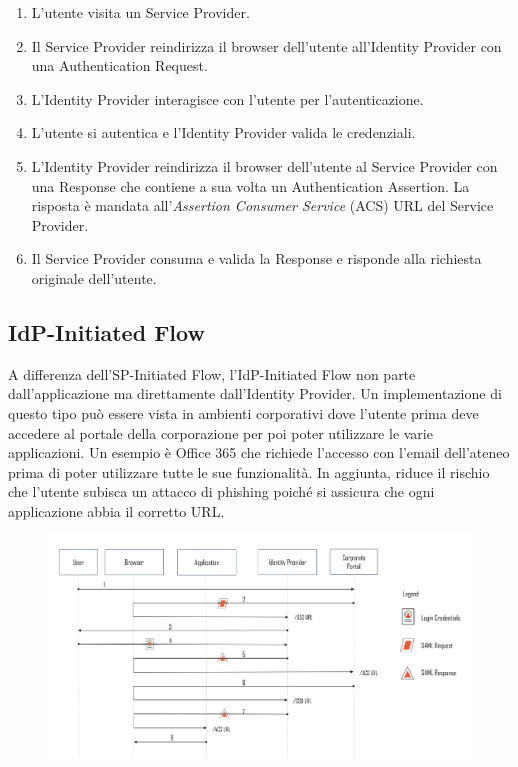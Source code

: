 \begin{enumerate}
      \item L'utente visita un Service Provider.
      \item Il Service Provider reindirizza il browser dell'utente all'Identity
            Provider con una \saml{} Authentication Request.
      \item L'Identity Provider interagisce con l'utente per l'autenticazione.
      \item L'utente si autentica e l'Identity Provider valida le credenziali.
      \item L'Identity Provider reindirizza il browser dell'utente al
            Service Provider con una \saml{} Response che contiene a sua volta un \saml{}
            Authentication Assertion. La risposta è mandata
            all'\textit{Assertion Consumer Service}
            (ACS) URL del Service Provider.
      \item Il Service Provider consuma e valida la \saml{} Response e risponde alla
            richiesta originale dell'utente.
\end{enumerate}

\subsection{IdP-Initiated Flow}

A differenza dell'SP-Initiated Flow, l'IdP-Initiated Flow non parte dall'applicazione
ma direttamente dall'Identity Provider. Un implementazione di questo tipo può essere
vista in ambienti corporativi dove l'utente prima deve accedere al portale della
corporazione per poi poter utilizzare le varie applicazioni.
Un esempio è Office 365 che richiede
l'accesso con l'email dell'ateneo prima di poter utilizzare tutte
le sue funzionalità. In aggiunta, riduce il rischio che l'utente subisca un attacco
di phishing poiché si assicura che ogni applicazione abbia il corretto URL.

\begin{figure}[H]
      \centering
      \includegraphics[width=\textwidth, keepaspectratio]{capitoli/id_managing/imgs/idp.png}
\end{figure}

